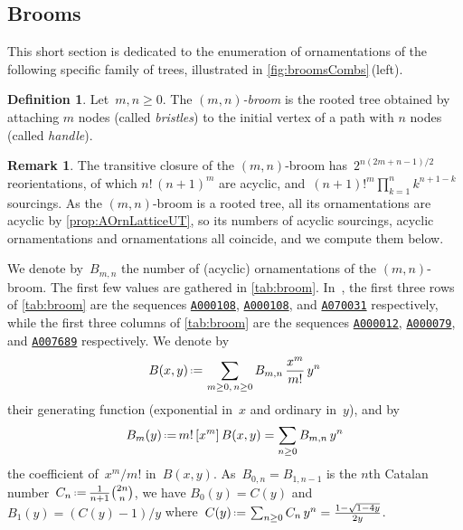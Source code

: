 \documentclass{amsart}
\theoremstyle{definition}
\newtheorem{definition}[theorem]{Definition}
\newtheorem{remark}[theorem]{Remark}
\newcommand{\eqdef}{\mbox{\,\raisebox{0.2ex}{\scriptsize\ensuremath{\mathrm:}}\ensuremath{=}\,}} %
\newcommand{\darkblue}{\color{darkblue}} %
\newcommand{\defn}[1]{\textsl{\darkblue #1}} %
\newcommand{\OEIS}[1]{{\rm \href{http://oeis.org/#1}{\texttt{#1}}}}
\begin{document}
\subsection{Brooms}
\label{subsec:brooms}

This short section is dedicated to the enumeration of ornamentations of the following specific family of trees, illustrated in \cref{fig:broomsCombs}\,(left).

\begin{definition}
Let~$m,n \ge 0$.
The \defn{$(m,n)$-broom} is the rooted tree obtained by attaching $m$ nodes (called \defn{bristles}) to the initial vertex of a path with $n$ nodes (called \defn{handle}).
\end{definition}

\begin{remark}
The transitive closure of the $(m,n)$-broom has~$2^{n(2m+n-1)/2}$ reorientations, of which $n! \, (n+1)^m$ are acyclic, and~$(n+1)!^m \prod_{k = 1}^n k^{n+1-k}$ sourcings.
As the $(m,n)$-broom is a rooted tree, all its ornamentations are acyclic by \cref{prop:AOrnLatticeUT}, so its numbers of acyclic sourcings, acyclic ornamentations and ornamentations all coincide, and we compute them below.
\end{remark}

We denote by~$B_{m,n}$ the number of (acyclic) ornamentations of the $(m,n)$-broom.
The first few values are gathered in \cref{tab:broom}.
In~\cite{OEIS}, the first three rows of \cref{tab:broom} are the sequences \OEIS{A000108}, \OEIS{A000108}, and \OEIS{A070031} respectively, while the first three columns of \cref{tab:broom} are the sequences \OEIS{A000012}, \OEIS{A000079}, and \OEIS{A007689} respectively.
We denote by
\[
B(x,y) \eqdef \sum_{m \ge 0, \, n \ge 0} B_{m,n} \, \frac{x^m}{m!} \, y^n
\]
their generating function (exponential in~$x$ and ordinary in~$y$), and by
\[
B_m(y) \eqdef m! \, [x^m] \, B(x,y) = \sum_{n \ge 0} B_{m,n} \, y^n
\]
the coefficient of~$x^m/m!$ in~$B(x,y)$.
As~$B_{0,n} = B_{1,n-1}$ is the $n$th Catalan number~$C_n \eqdef \frac{1}{n+1}\binom{2n}{n}$, we have $B_0(y) = C(y)$ and~$B_1(y) = (C(y) - 1)/y$ where~$C(y) \eqdef \sum_{n \ge 0} C_n \, y^n = \frac{1-\sqrt{1-4y}}{2y}$.
\end{document}
